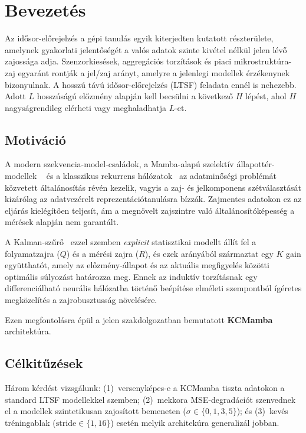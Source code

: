 \chapter{Bevezetés}
\label{ch:intro}

Az idősor-előrejelzés a gépi tanulás egyik kiterjedten kutatott
részterülete, amelynek gyakorlati jelentőségét a valós adatok szinte
kivétel nélkül jelen lévő zajossága adja. Szenzorkiesések, aggregációs
torzítások és piaci mikrostruktúra-zaj egyaránt rontják a jel/zaj arányt,
amelyre a jelenlegi modellek érzékenynek bizonyulnak.
A hosszú távú idősor-előrejelzés (LTSF) feladata ennél is nehezebb.
Adott $L$ hosszúságú előzmény alapján kell becsülni a következő $H$ lépést,
ahol $H$ nagyságrendileg elérheti vagy meghaladhatja $L$-et.

\section{Motiváció}

A modern szekvencia-model-családok, a Mamba-alapú szelektív állapottér-modellek
~\cite{gu2021s4,gu2023mamba} és a klasszikus rekurrens hálózatok~\cite{hochreiter1997lstm}
az adatminőségi problémát közvetett általánosítás révén kezelik, vagyis a zaj- és
jelkomponens szétválasztását kizárólag az adatvezérelt reprezentációtanulásra
bízzák.
Zajmentes adatokon ez az eljárás kielégítően teljesít, ám a megnövelt
zajszintre való általánosítóképesség a mérések alapján nem garantált.

A Kalman-szűrő~\cite{kalman1960new} ezzel szemben \emph{explicit}
statisztikai modellt állít fel a folyamatzajra ($Q$) és a mérési zajra ($R$),
és ezek arányából származtat egy $K$ gain együtthatót, amely az
előzmény-állapot és az aktuális megfigyelés közötti optimális súlyozást
határozza meg. Ennek az induktív torzításnak egy differenciálható
neurális hálózatba történő beépítése elméleti szempontból ígéretes
megközelítés a zajrobusztusság növelésére.

Ezen megfontolásra épül a jelen szakdolgozatban bemutatott \textbf{KCMamba}
architektúra.

\section{Célkitűzések}

Három kérdést vizsgálunk: (1)~versenyképes-e a KCMamba tiszta adatokon
a standard LTSF modellekkel szemben; (2)~mekkora MSE-degradációt szenvednek
el a modellek szintetikusan zajosított bemeneten ($\sigma \in \{0, 1, 3, 5\}$);
és (3)~kevés tréningablak ($\text{stride} \in \{1, 16\}$) esetén melyik
architekúra generalizál jobban.

